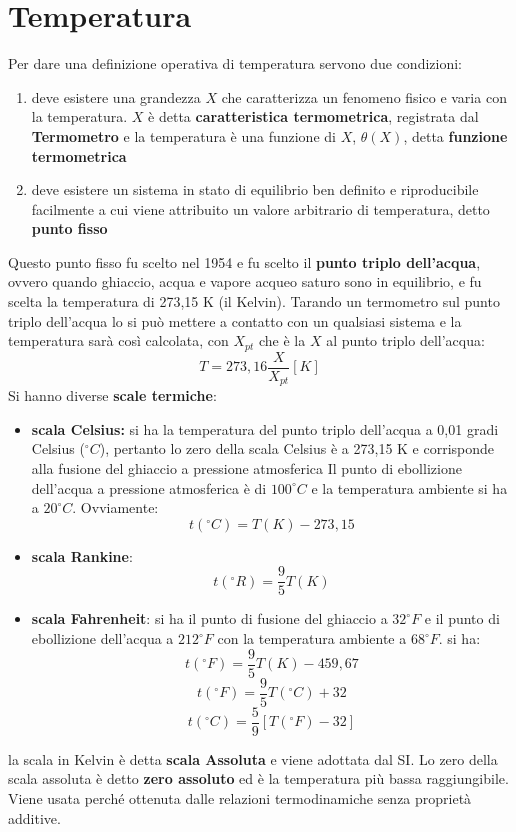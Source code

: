 \documentclass[a4paper,12pt, oneside]{book}
\begin{document}
\section{Temperatura}
Per dare una definizione operativa di temperatura servono due condizioni:
\begin{enumerate}
	\item deve esistere una grandezza $X$ che caratterizza un fenomeno fisico e varia con la temperatura. $X$ è detta \textbf{caratteristica termometrica}, registrata dal \textbf{Termometro} e la temperatura è una funzione di $X$, $\theta(X)$, detta \textbf{funzione termometrica}
	\item deve esistere un sistema in stato di equilibrio ben definito e riproducibile facilmente a cui viene attribuito un valore arbitrario di temperatura, detto \textbf{punto fisso}
\end{enumerate}
Questo punto fisso fu scelto nel 1954 e fu scelto il \textbf{punto triplo dell'acqua}, ovvero quando ghiaccio, acqua e vapore acqueo saturo sono in equilibrio, e fu scelta la temperatura di 273,15 K (il Kelvin). Tarando un termometro sul punto triplo dell'acqua lo si può mettere a contatto con un qualsiasi sistema e la temperatura sarà così calcolata, con $X_{pt}$ che è la $X$ al punto triplo dell'acqua:
$$T=273,16\frac{X}{X_{pt}}[K]$$
\newpage
Si hanno diverse \textbf{scale termiche}:
\begin{itemize}
	\item \textbf{scala Celsius:} si ha la temperatura del punto triplo dell'acqua a 0,01 gradi Celsius ($^{\circ}C$), pertanto lo zero della scala Celsius è a 273,15 K e corrisponde alla fusione del ghiaccio a pressione atmosferica Il punto di ebollizione dell'acqua a pressione atmosferica è di $100^{\circ}C$ e la temperatura ambiente si ha a $20^{\circ}C$. Ovviamente:
	      $$t(^{\circ}C)=T(K)-273,15$$
	\item \textbf{scala Rankine}:
	      $$t(^{\circ}R)=\frac{9}{5} T(K)$$
	\item \textbf{scala Fahrenheit}: si ha il punto di fusione del ghiaccio a $32^{\circ}F$ e il punto di ebollizione dell'acqua a $212^{\circ}F$ con la temperatura ambiente a $68^{\circ}F$. si ha:
	      $$t(^{\circ}F)=\frac{9}{5} T(K)-459,67$$
	      $$t(^{\circ}F)=\frac{9}{5} T(^{\circ}C)+32$$
	      $$t(^{\circ}C)=\frac{5}{9} [T(^{\circ}F)-32]$$
\end{itemize}
la scala in Kelvin è detta \textbf{scala Assoluta} e viene adottata dal SI. Lo zero della scala assoluta è detto \textbf{zero assoluto} ed è la temperatura più bassa raggiungibile. Viene usata perché ottenuta dalle relazioni termodinamiche senza proprietà additive.
\end{document}
